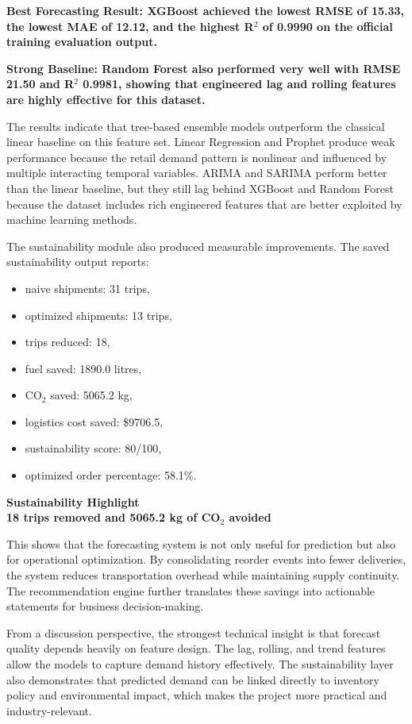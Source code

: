 \documentclass[12pt,a4paper]{article}
\newcommand{\highlightbox}[3]{
\begin{tcolorbox}[
    enhanced,
    colback=#1,
    colframe=#2,
    boxrule=0.8pt,
    arc=3pt,
    left=8pt,
    right=8pt,
    top=8pt,
    bottom=8pt
]
\textbf{#3}
\end{tcolorbox}
}
\newcommand{\keymetric}[2]{
\begin{tcolorbox}[
    enhanced,
    colback=SoftGray,
    colframe=PrimaryBlue,
    boxrule=0.8pt,
    arc=4pt,
    width=\linewidth
]
\textbf{#1}\\
\Large\textbf{#2}
\end{tcolorbox}
}
\begin{document}
\highlightbox{SoftGreen}{AccentGreen}{Best Forecasting Result: XGBoost achieved the lowest RMSE of 15.33, the lowest MAE of 12.12, and the highest R$^2$ of 0.9990 on the official training evaluation output.}

\highlightbox{SoftAmber}{AccentOrange}{Strong Baseline: Random Forest also performed very well with RMSE 21.50 and R$^2$ 0.9981, showing that engineered lag and rolling features are highly effective for this dataset.}

The results indicate that tree-based ensemble models outperform the classical linear baseline on this feature set. Linear Regression and Prophet produce weak performance because the retail demand pattern is nonlinear and influenced by multiple interacting temporal variables. ARIMA and SARIMA perform better than the linear baseline, but they still lag behind XGBoost and Random Forest because the dataset includes rich engineered features that are better exploited by machine learning methods.

The sustainability module also produced measurable improvements. The saved sustainability output reports:
\begin{itemize}[leftmargin=*]
    \item naive shipments: 31 trips,
    \item optimized shipments: 13 trips,
    \item trips reduced: 18,
    \item fuel saved: 1890.0 litres,
    \item CO$_2$ saved: 5065.2 kg,
    \item logistics cost saved: \$9706.5,
    \item sustainability score: 80/100,
    \item optimized order percentage: 58.1\%.
\end{itemize}

\keymetric{Sustainability Highlight}{18 trips removed and 5065.2 kg of CO$_2$ avoided}

This shows that the forecasting system is not only useful for prediction but also for operational optimization. By consolidating reorder events into fewer deliveries, the system reduces transportation overhead while maintaining supply continuity. The recommendation engine further translates these savings into actionable statements for business decision-making.

From a discussion perspective, the strongest technical insight is that forecast quality depends heavily on feature design. The lag, rolling, and trend features allow the models to capture demand history effectively. The sustainability layer also demonstrates that predicted demand can be linked directly to inventory policy and environmental impact, which makes the project more practical and industry-relevant.
\end{document}
